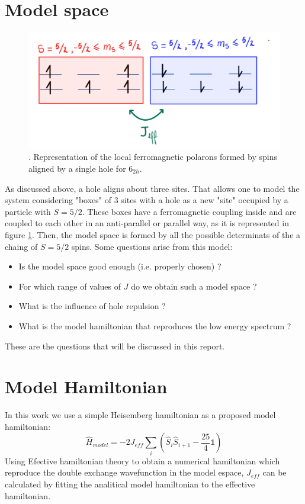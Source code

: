 \documentclass[12pt,twoside]{report}
\begin{document}
	\section{Model space}
	\begin{figure}[ht]
		\centering
			\includegraphics[scale=0.2]{boites.png}
		\caption{\label{boites}. Representation of the local ferromagnetic polarons formed by spins aligned by a single hole for 6$_{2h}$.}
	\end{figure}
	As discussed above, a hole aligns about three sites. That allows one to
	model the system considering "boxes" of 3 sites with a hole as a new "site"
	occupied by a particle with  $S=5 \slash 2$. These boxes have a
	ferromagnetic coupling inside and are coupled to each other in an
	anti-parallel or parallel way, as it is represented in figure \ref{boites}.
	Then, the model space is formed by all the possible determinats of the a
	chaing of $S=5 \slash 2$ spins. Some questions arise from this model:
	\begin{itemize}
	    \item Is the model space good enough (i.e. properly chosen) ?
	    \item For which range of values of $J$ do we obtain such a model space ?
	    \item What is the influence of hole repulsion ?
	    \item What is the model hamiltonian that reproduces the low energy spectrum ?
	\end{itemize}
	These are the questions that will be discussed in this report.
	
	
	\section{Model Hamiltonian}
	In this work we use a simple Heisemberg hamiltonian as a proposed model hamiltonian:
	\begin{equation}
	\hat{H}_{model}=-2J_{eff}\sum_i (\hat{S}_i\hat{S}_{i+1}-\frac{25}{4}\mathbb{1})
	\end{equation}
	Using Efective hamiltonian theory \cite{heff} to obtain a numerical hamiltonian which reproduce the double exchange wavefunction in the model espace, $J_{eff}$ can be calculated by fitting the analitical model hamiltonian to the effective hamiltonian.
\end{document}
